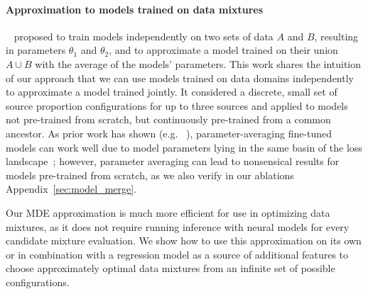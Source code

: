 


\paragraph{Approximation to models trained on data mixtures}

~\citet{emnlp-merge} proposed to train models independently on two sets of data $A$ and $B$, resulting in parameters $\theta_1$ and $\theta_2$, and to approximate a model trained on their union $A \cup B$ with the average of the models' parameters. This work shares the intuition of our approach that we can use models trained on data domains independently to approximate a model trained jointly.  It  considered a discrete, small set of source proportion configurations for up to three sources and applied to models not pre-trained from scratch, but continuously pre-trained from a common ancestor. As prior work has shown (e.g. ~\cite{pmlr-v162-wortsman22a}), parameter-averaging fine-tuned models can work well due to model parameters lying in the same basin of the loss landscape~\cite{NEURIPS2020_0607f4c7}; however, parameter averaging can lead to nonsensical results for models pre-trained from scratch, as we also verify in our ablations Appendix~\ref{sec:model_merge}.

Our  MDE approximation is much more efficient for use in optimizing data mixtures, as it does not require running inference with neural models for every candidate mixture evaluation. We show how to use this approximation on its own or in combination with a regression model as a source of additional features to choose approximately optimal data mixtures from an infinite set of possible configurations.
